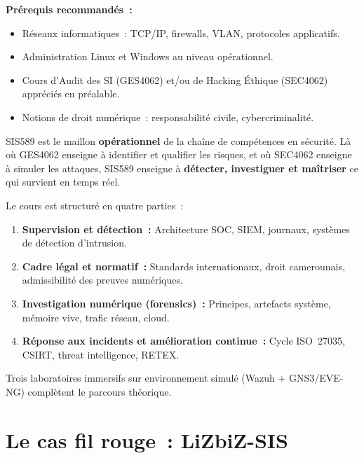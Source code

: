 \begin{boxinfo}
\textbf{Prérequis recommandés~:}
\begin{itemize}
  \item Réseaux informatiques~: TCP/IP, firewalls, VLAN, protocoles applicatifs.
  \item Administration Linux et Windows au niveau opérationnel.
  \item Cours d'Audit des SI (GES4062) et/ou de Hacking Éthique (SEC4062)
        appréciés en préalable.
  \item Notions de droit numérique~: responsabilité civile, cybercriminalité.
\end{itemize}
\end{boxinfo}

SIS589 est le maillon \textbf{opérationnel} de la chaîne de compétences en
sécurité. Là où GES4062 enseigne à identifier et qualifier les risques, et
où SEC4062 enseigne à simuler les attaques, SIS589 enseigne à
\textbf{détecter, investiguer et maîtriser} ce qui survient en temps réel.

Le cours est structuré en quatre parties~:

\begin{enumerate}
  \item \textbf{Supervision et détection~:} Architecture SOC, SIEM, journaux,
        systèmes de détection d'intrusion.
  \item \textbf{Cadre légal et normatif~:} Standards internationaux, droit
        camerounais, admissibilité des preuves numériques.
  \item \textbf{Investigation numérique (forensics)~:} Principes, artefacts
        système, mémoire vive, trafic réseau, cloud.
  \item \textbf{Réponse aux incidents et amélioration continue~:} Cycle
        ISO~27035, CSIRT, threat intelligence, RETEX.
\end{enumerate}

Trois laboratoires immersifs sur environnement simulé (Wazuh + GNS3/EVE-NG)
complètent le parcours théorique.

\section*{Le cas fil rouge~: LiZbiZ-SIS}

